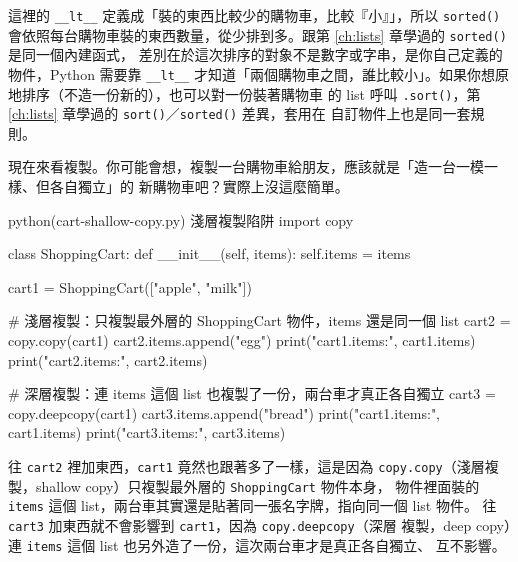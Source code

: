 這裡的 \texttt{\_\_lt\_\_} 定義成「裝的東西比較少的購物車，比較『小』」，所以 \texttt{sorted()}
會依照每台購物車裝的東西數量，從少排到多。跟第 \ref{ch:lists} 章學過的 \texttt{sorted()} 是同一個內建函式，
差別在於這次排序的對象不是數字或字串，是你自己定義的物件，Python 需要靠 \texttt{\_\_lt\_\_}
才知道「兩個購物車之間，誰比較小」。如果你想原地排序（不造一份新的），也可以對一份裝著購物車
的 list 呼叫 \texttt{.sort()}，第 \ref{ch:lists} 章學過的 \texttt{sort()}／\texttt{sorted()} 差異，套用在
自訂物件上也是同一套規則。


現在來看複製。你可能會想，複製一台購物車給朋友，應該就是「造一台一模一樣、但各自獨立」的
新購物車吧？實際上沒這麼簡單。

\begin{example}{python}{(cart-shallow-copy.py) 淺層複製陷阱}
import copy


class ShoppingCart:
    def __init__(self, items):
        self.items = items


cart1 = ShoppingCart(["apple", "milk"])

# 淺層複製：只複製最外層的 ShoppingCart 物件，items 還是同一個 list
cart2 = copy.copy(cart1)
cart2.items.append("egg")
print("cart1.items:", cart1.items)
print("cart2.items:", cart2.items)

# 深層複製：連 items 這個 list 也複製了一份，兩台車才真正各自獨立
cart3 = copy.deepcopy(cart1)
cart3.items.append("bread")
print("cart1.items:", cart1.items)
print("cart3.items:", cart3.items)
\end{example}


往 \texttt{cart2} 裡加東西，\texttt{cart1} 竟然也跟著多了一樣，這是因為
\texttt{copy.copy}（淺層複製，shallow copy）只複製最外層的 \texttt{ShoppingCart} 物件本身，
物件裡面裝的 \texttt{items} 這個 list，兩台車其實還是貼著同一張名字牌，指向同一個 list
物件。
往 \texttt{cart3} 加東西就不會影響到 \texttt{cart1}，因為 \texttt{copy.deepcopy}（深層
複製，deep copy）連 \texttt{items} 這個 list 也另外造了一份，這次兩台車才是真正各自獨立、
互不影響。

